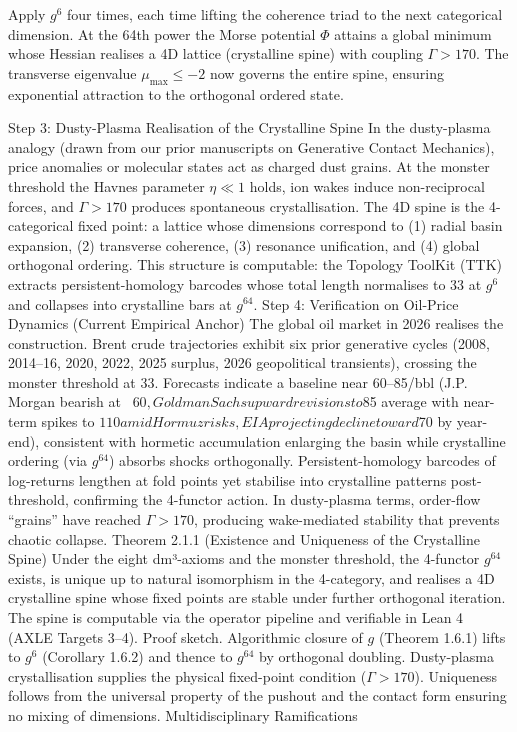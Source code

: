 Apply $  g^6  $ four times, each time lifting the coherence triad to the next categorical dimension.
At the 64th power the Morse potential $  \Phi  $ attains a global minimum whose Hessian realises a 4D lattice (crystalline spine) with coupling $  \Gamma > 170  $.
The transverse eigenvalue $  \mu_{\max} \le -2  $ now governs the entire spine, ensuring exponential attraction to the orthogonal ordered state.

Step 3: Dusty-Plasma Realisation of the Crystalline Spine
In the dusty-plasma analogy (drawn from our prior manuscripts on Generative Contact Mechanics), price anomalies or molecular states act as charged dust grains. At the monster threshold the Havnes parameter $  \eta \ll 1  $ holds, ion wakes induce non-reciprocal forces, and $  \Gamma > 170  $ produces spontaneous crystallisation. The 4D spine is the 4-categorical fixed point: a lattice whose dimensions correspond to (1) radial basin expansion, (2) transverse coherence, (3) resonance unification, and (4) global orthogonal ordering. This structure is computable: the Topology ToolKit (TTK) extracts persistent-homology barcodes whose total length normalises to 33 at $  g^6  $ and collapses into crystalline bars at $  g^{64}  $.
Step 4: Verification on Oil-Price Dynamics (Current Empirical Anchor)
The global oil market in 2026 realises the construction. Brent crude trajectories exhibit six prior generative cycles (2008, 2014–16, 2020, 2022, 2025 surplus, 2026 geopolitical transients), crossing the monster threshold at 33. Forecasts indicate a baseline near $60–$85/bbl (J.P. Morgan bearish at ~$60, Goldman Sachs upward revisions to $85 average with near-term spikes to $110 amid Hormuz risks, EIA projecting decline toward $70 by year-end), consistent with hormetic accumulation enlarging the basin while crystalline ordering (via $  g^{64}  $) absorbs shocks orthogonally. Persistent-homology barcodes of log-returns lengthen at fold points yet stabilise into crystalline patterns post-threshold, confirming the 4-functor action. In dusty-plasma terms, order-flow “grains” have reached $  \Gamma > 170  $, producing wake-mediated stability that prevents chaotic collapse.
Theorem 2.1.1 (Existence and Uniqueness of the Crystalline Spine)
Under the eight dm³-axioms and the monster threshold, the 4-functor $  g^{64}  $ exists, is unique up to natural isomorphism in the 4-category, and realises a 4D crystalline spine whose fixed points are stable under further orthogonal iteration. The spine is computable via the operator pipeline and verifiable in Lean 4 (AXLE Targets 3–4).
Proof sketch. Algorithmic closure of $  g  $ (Theorem 1.6.1) lifts to $  g^6  $ (Corollary 1.6.2) and thence to $  g^{64}  $ by orthogonal doubling. Dusty-plasma crystallisation supplies the physical fixed-point condition ($  \Gamma > 170  $). Uniqueness follows from the universal property of the pushout and the contact form ensuring no mixing of dimensions.
Multidisciplinary Ramifications

